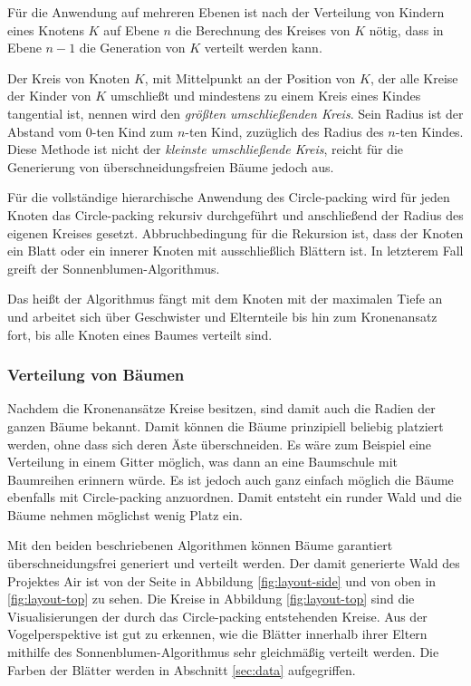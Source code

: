 Für die Anwendung auf mehreren Ebenen ist nach der Verteilung von Kindern eines Knotens $K$ auf Ebene $n$ die Berechnung des Kreises von $K$ nötig, dass in Ebene $n - 1$ die Generation von $K$ verteilt werden kann.

Der Kreis von Knoten $K$, mit Mittelpunkt an der Position von $K$, der alle Kreise der Kinder von $K$ umschließt und mindestens zu einem Kreis eines Kindes tangential ist, nennen wird den \textit{größten umschließenden Kreis}. Sein Radius ist der Abstand vom $0$-ten Kind zum $n$-ten Kind, zuzüglich des Radius des $n$-ten Kindes. Diese Methode ist nicht der \textit{kleinste umschließende Kreis}, reicht für die Generierung von überschneidungsfreien Bäume jedoch aus.

Für die vollständige hierarchische Anwendung des Circle-packing wird für jeden Knoten das Circle-packing rekursiv durchgeführt und anschließend der Radius des eigenen Kreises gesetzt. Abbruchbedingung für die Rekursion ist, dass der Knoten ein Blatt oder ein innerer Knoten mit ausschließlich Blättern ist. In letzterem Fall greift der Sonnenblumen-Algorithmus.

Das heißt der Algorithmus fängt mit dem Knoten mit der maximalen Tiefe an und arbeitet sich über Geschwister und Elternteile bis hin zum Kronenansatz fort, bis alle Knoten eines Baumes verteilt sind.

\subsubsection*{Verteilung von Bäumen}


Nachdem die Kronenansätze Kreise besitzen, sind damit auch die Radien der ganzen Bäume bekannt. Damit können die Bäume prinzipiell beliebig platziert werden, ohne dass sich deren Äste überschneiden. Es wäre zum Beispiel eine Verteilung in einem Gitter möglich, was dann an eine Baumschule mit Baumreihen erinnern würde. Es ist jedoch auch ganz einfach möglich die Bäume ebenfalls mit Circle-packing anzuordnen. Damit entsteht ein runder Wald und die Bäume nehmen möglichst wenig Platz ein.

Mit den beiden beschriebenen Algorithmen können Bäume garantiert überschneidungsfrei generiert und verteilt werden. Der damit generierte Wald des Projektes Air ist von der Seite in Abbildung \ref{fig:layout-side} und von oben in \ref{fig:layout-top} zu sehen. Die Kreise in Abbildung \ref{fig:layout-top} sind die Visualisierungen der durch das Circle-packing entstehenden Kreise. Aus der Vogelperspektive ist gut zu erkennen, wie die Blätter innerhalb ihrer Eltern mithilfe des Sonnenblumen-Algorithmus sehr gleichmäßig verteilt werden. Die Farben der Blätter werden in Abschnitt \ref{sec:data} aufgegriffen.

